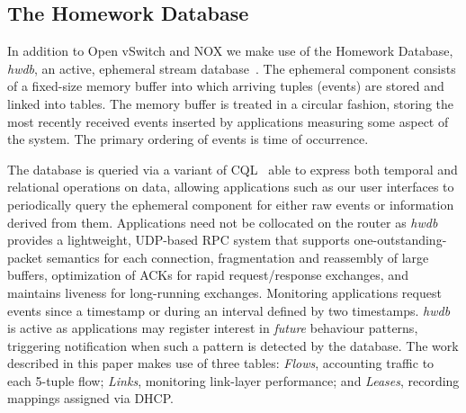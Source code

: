 
\subsection{The Homework Database}
\label{s:hwdb}
 
 
In addition to Open vSwitch and NOX we make use of the Homework
Database, \emph{hwdb}, an active, ephemeral stream
database~\cite{sventek11:_infor_plane_archit_suppor_home_networ_manag}.
The ephemeral component consists of a fixed-size memory buffer into
which arriving tuples (events) are stored and linked into tables.  The
memory buffer is treated in a circular fashion, storing the most
recently received events inserted by applications measuring some
aspect of the system.  The primary ordering of events is time of
occurrence.  

The database is queried via a variant of
CQL~\cite{arasu05:_cql} able to express both temporal and relational
operations on data, allowing applications such as our user
interfaces to periodically query the ephemeral component for either 
raw events or information derived from them. 
Applications need not be collocated on the router as \emph{hwdb}
provides a lightweight, UDP-based RPC system that supports
one-outstanding-packet semantics for each connection, fragmentation
and reassembly of large buffers, optimization of ACKs for rapid
request/response exchanges, and maintains liveness for
long-running exchanges.  Monitoring applications request events since
a timestamp or during an interval defined by two timestamps.
\emph{hwdb} is active as applications may register interest in
\emph{future} behaviour patterns, triggering notification when such a
pattern is detected by the database.  The work described in this paper
makes use of three tables: \emph{Flows}, accounting traffic to each
5-tuple flow; \emph{Links}, monitoring link-layer performance; and
\emph{Leases}, recording mappings assigned via DHCP.

